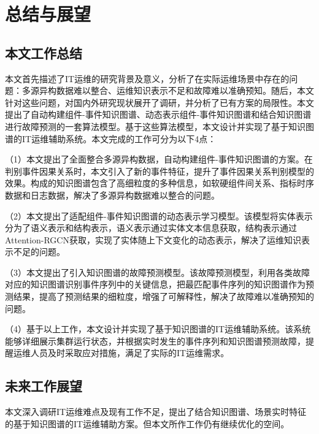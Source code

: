 \chapter{总结与展望}
\section{本文工作总结}
本文首先描述了IT运维的研究背景及意义，分析了在实际运维场景中存在的问题：多源异构数据难以整合、运维知识表示不足和故障难以准确预知。随后，本文针对这些问题，对国内外研究现状展开了调研，并分析了已有方案的局限性。本文提出了自动构建组件-事件知识图谱、动态表示组件-事件知识图谱和结合知识图谱进行故障预测的一套算法模型。基于这些算法模型，本文设计并实现了基于知识图谱的IT运维辅助系统。本文完成的工作可分为以下4点：

（1）本文提出了全面整合多源异构数据，自动构建组件-事件知识图谱的方案。在判别事件因果关系时，本文引入了新的事件特征，提升了事件因果关系判别模型的效果。构成的知识图谱包含了高细粒度的多种信息，如软硬组件间关系、指标时序数据和日志数据，解决了多源异构数据难以整合的问题。

（2）本文提出了适配组件-事件知识图谱的动态表示学习模型。该模型将实体表示分为了语义表示和结构表示，语义表示通过实体文本信息获取，结构表示通过Attention-RGCN获取，实现了实体随上下文变化的动态表示，解决了运维知识表示不足的问题。

（3）本文提出了引入知识图谱的故障预测模型。该故障预测模型，利用各类故障对应的知识图谱识别事件序列中的关键信息，把最匹配事件序列的知识图谱作为预测结果，提高了预测结果的细粒度，增强了可解释性，解决了故障难以准确预知的问题。

（4）基于以上工作，本文设计并实现了基于知识图谱的IT运维辅助系统。该系统能够详细展示集群运行状态，并根据实时发生的事件序列和知识图谱预测故障，提醒运维人员及时采取应对措施，满足了实际的IT运维需求。

\section{未来工作展望}
本文深入调研IT运维难点及现有工作不足，提出了结合知识图谱、场景实时特征的基于知识图谱的IT运维辅助方案。但本文所作工作仍有继续优化的空间。

